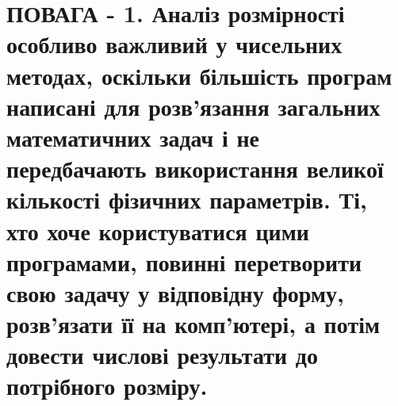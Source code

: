 \documentclass[
  ukrainian,
]{article}
\begin{document}
\section{ПОВАГА - 1. Аналіз розмірності особливо важливий у чисельних
методах, оскільки більшість програм написані для розв'язання загальних
математичних задач і не передбачають використання великої кількості
фізичних параметрів. Ті, хто хоче користуватися цими програмами, повинні
перетворити свою задачу у відповідну форму, розв'язати її на комп'ютері,
а потім довести числові результати до потрібного
розміру.}\label{ux43fux43eux432ux430ux433ux430---1.-ux430ux43dux430ux43bux456ux437-ux440ux43eux437ux43cux456ux440ux43dux43eux441ux442ux456-ux43eux441ux43eux431ux43bux438ux432ux43e-ux432ux430ux436ux43bux438ux432ux438ux439-ux443-ux447ux438ux441ux435ux43bux44cux43dux438ux445-ux43cux435ux442ux43eux434ux430ux445-ux43eux441ux43aux456ux43bux44cux43aux438-ux431ux456ux43bux44cux448ux456ux441ux442ux44c-ux43fux440ux43eux433ux440ux430ux43c-ux43dux430ux43fux438ux441ux430ux43dux456-ux434ux43bux44f-ux440ux43eux437ux432ux44fux437ux430ux43dux43dux44f-ux437ux430ux433ux430ux43bux44cux43dux438ux445-ux43cux430ux442ux435ux43cux430ux442ux438ux447ux43dux438ux445-ux437ux430ux434ux430ux447-ux456-ux43dux435-ux43fux435ux440ux435ux434ux431ux430ux447ux430ux44eux442ux44c-ux432ux438ux43aux43eux440ux438ux441ux442ux430ux43dux43dux44f-ux432ux435ux43bux438ux43aux43eux457-ux43aux456ux43bux44cux43aux43eux441ux442ux456-ux444ux456ux437ux438ux447ux43dux438ux445-ux43fux430ux440ux430ux43cux435ux442ux440ux456ux432.-ux442ux456-ux445ux442ux43e-ux445ux43eux447ux435-ux43aux43eux440ux438ux441ux442ux443ux432ux430ux442ux438ux441ux44f-ux446ux438ux43cux438-ux43fux440ux43eux433ux440ux430ux43cux430ux43cux438-ux43fux43eux432ux438ux43dux43dux456-ux43fux435ux440ux435ux442ux432ux43eux440ux438ux442ux438-ux441ux432ux43eux44e-ux437ux430ux434ux430ux447ux443-ux443-ux432ux456ux434ux43fux43eux432ux456ux434ux43dux443-ux444ux43eux440ux43cux443-ux440ux43eux437ux432ux44fux437ux430ux442ux438-ux457ux457-ux43dux430-ux43aux43eux43cux43fux44eux442ux435ux440ux456-ux430-ux43fux43eux442ux456ux43c-ux434ux43eux432ux435ux441ux442ux438-ux447ux438ux441ux43bux43eux432ux456-ux440ux435ux437ux443ux43bux44cux442ux430ux442ux438-ux434ux43e-ux43fux43eux442ux440ux456ux431ux43dux43eux433ux43e-ux440ux43eux437ux43cux456ux440ux443.}
\end{document}
